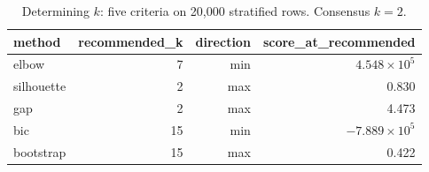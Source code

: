 \begin{table}[htbp]
\centering
\begin{tabular}{lrrr}
\toprule
method & recommended\_k & direction & score\_at\_recommended \\
\midrule
elbow & 7 & min & $4.548\times 10^{5}$ \\
silhouette & 2 & max & 0.830 \\
gap & 2 & max & 4.473 \\
bic & 15 & min & $-7.889\times 10^{5}$ \\
bootstrap & 15 & max & 0.422 \\
\bottomrule
\end{tabular}
\caption{Determining $k$: five criteria on 20{,}000 stratified rows. Consensus $k=2$.}
\label{tab:k-selection}
\end{table}

